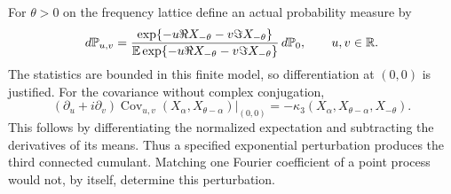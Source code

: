 \documentclass[11pt,reqno]{amsart}
\theoremstyle{plain}\newtheorem{theorem}{Theorem}[section]\newtheorem{proposition}[theorem]{Proposition}\newtheorem{lemma}[theorem]{Lemma}\newtheorem{corollary}[theorem]{Corollary}
\theoremstyle{definition}\newtheorem{hypothesis}[theorem]{Hypothesis}\newtheorem{definition}[theorem]{Definition}
\theoremstyle{remark}\newtheorem{remark}[theorem]{Remark}\newtheorem{experiment}[theorem]{Experiment}\newtheorem{question}[theorem]{Question}\newtheorem{heuristic}[theorem]{Heuristic}\newtheorem{conjecture}[theorem]{Conjecture}
\begin{document}
For $\theta>0$ on the frequency lattice define an actual probability measure by
\begin{equation}
 d\mathbb P_{u,v}=\frac{\exp\{-u\Re X_{-\theta}-v\Im X_{-\theta}\}}
 {\mathbb E\exp\{-u\Re X_{-\theta}-v\Im X_{-\theta}\}}\,d\mathbb P_0,
 \qquad u,v\in\mathbb R.
 \label{eq:real_tilt}
\end{equation}
The statistics are bounded in this finite model, so differentiation at $(0,0)$ is justified. For the covariance without complex conjugation,
\begin{equation}
 (\partial_u+i\partial_v)
 \operatorname{Cov}_{u,v}(X_\alpha,X_{\theta-\alpha})\big|_{(0,0)}
   =-\kappa_3(X_\alpha,X_{\theta-\alpha},X_{-\theta}).
 \label{eq:tilt_cumulant}
\end{equation}
This follows by differentiating the normalized expectation and subtracting the derivatives of its means. Thus a specified exponential perturbation produces the third connected cumulant. Matching one Fourier coefficient of a point process would not, by itself, determine this perturbation.
\end{document}
